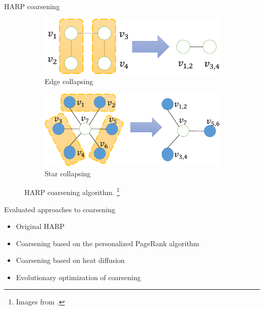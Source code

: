 \documentclass[10pt]{beamer}
\begin{document}
\begin{frame}{HARP coarsening}
	\begin{figure}
		\centering
		\begin{subfigure}[t]{0.38\textwidth}
			\centering
			\includegraphics[width=\textwidth]{images/edge_collapsing.png}
			\caption{Edge collapsing}
		\end{subfigure}
		\hspace{2em}
		\begin{subfigure}[t]{0.38\textwidth}
			\centering
			\includegraphics[width=\textwidth]{images/star_collapsing.png}
			\caption{Star collapsing}
		\end{subfigure}
		\caption{HARP coarsening algorithm. \footnote{Images from \cite{chen_harp_2018}.}}
	\end{figure}
\end{frame}

\begin{frame}{Evaluated approaches to coarsening}
	\begin{itemize}
		\item Original HARP
		\item Coarsening based on the personalized PageRank algorithm
		\item Coarsening based on heat diffusion
		\item Evolutionary optimization of coarsening
	\end{itemize}
\end{frame}
\end{document}
